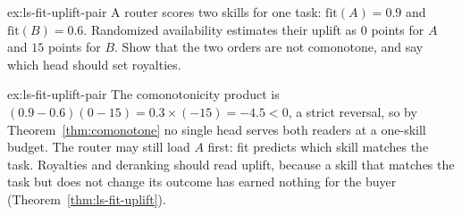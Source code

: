 \begin{pdexercise}[kind=Check,rating=1]{ex:ls-fit-uplift-pair}
A router scores two skills for one task: $\mathrm{fit}(A)=0.9$ and
$\mathrm{fit}(B)=0.6$. Randomized availability estimates their uplift as
$0$ points for $A$ and $15$ points for $B$. Show that the two orders are not
comonotone, and say which head should set royalties.
\end{pdexercise}
\begin{pdsolution}{ex:ls-fit-uplift-pair}
The comonotonicity product is
$(0.9-0.6)(0-15)=0.3\times(-15)=-4.5<0$, a strict reversal, so by
Theorem~\ref{thm:comonotone} no single head serves both readers at a
one-skill budget. The router may still load $A$ first: fit predicts which
skill matches the task. Royalties and deranking should read uplift, because
a skill that matches the task but does not change its outcome has earned
nothing for the buyer (Theorem~\ref{thm:ls-fit-uplift}).
\end{pdsolution}
